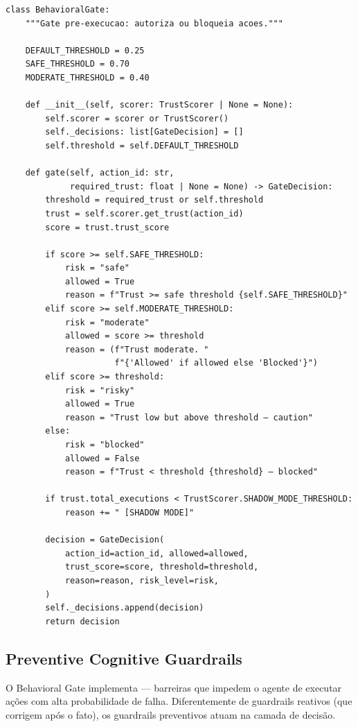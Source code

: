 \begin{lstlisting}[style=pythonstyle, caption={BehavioralGate: classificacao de risco (trust\_engine.py:182-274)}]
class BehavioralGate:
    """Gate pre-execucao: autoriza ou bloqueia acoes."""

    DEFAULT_THRESHOLD = 0.25
    SAFE_THRESHOLD = 0.70
    MODERATE_THRESHOLD = 0.40

    def __init__(self, scorer: TrustScorer | None = None):
        self.scorer = scorer or TrustScorer()
        self._decisions: list[GateDecision] = []
        self.threshold = self.DEFAULT_THRESHOLD

    def gate(self, action_id: str,
             required_trust: float | None = None) -> GateDecision:
        threshold = required_trust or self.threshold
        trust = self.scorer.get_trust(action_id)
        score = trust.trust_score

        if score >= self.SAFE_THRESHOLD:
            risk = "safe"
            allowed = True
            reason = f"Trust >= safe threshold {self.SAFE_THRESHOLD}"
        elif score >= self.MODERATE_THRESHOLD:
            risk = "moderate"
            allowed = score >= threshold
            reason = (f"Trust moderate. "
                      f"{'Allowed' if allowed else 'Blocked'}")
        elif score >= threshold:
            risk = "risky"
            allowed = True
            reason = "Trust low but above threshold — caution"
        else:
            risk = "blocked"
            allowed = False
            reason = f"Trust < threshold {threshold} — blocked"

        if trust.total_executions < TrustScorer.SHADOW_MODE_THRESHOLD:
            reason += " [SHADOW MODE]"

        decision = GateDecision(
            action_id=action_id, allowed=allowed,
            trust_score=score, threshold=threshold,
            reason=reason, risk_level=risk,
        )
        self._decisions.append(decision)
        return decision
\end{lstlisting}

\subsection{Preventive Cognitive Guardrails}

O Behavioral Gate implementa  — barreiras que impedem o agente de executar ações com
alta probabilidade de falha. Diferentemente de guardrails reativos
(que corrigem após o fato), os guardrails preventivos atuam na camada
de decisão.

